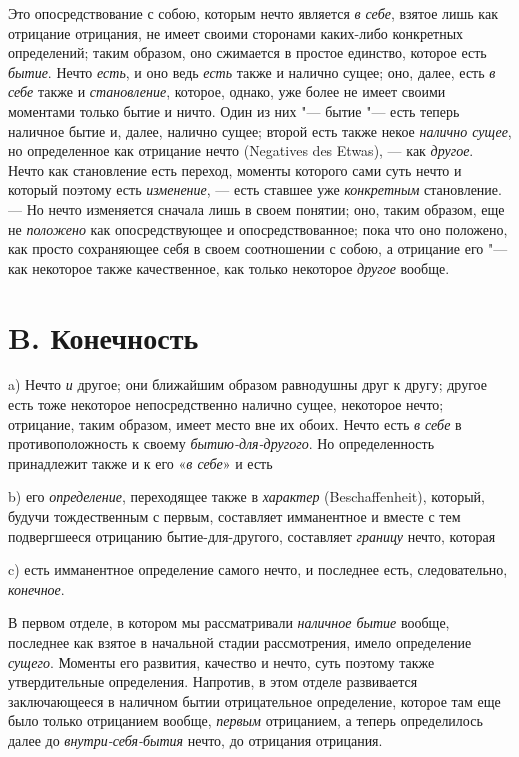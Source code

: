 Это опосредствование с собою, которым нечто является
{\em в себе}, взятое лишь как отрицание отрицания, не
имеет своими сторонами каких-либо конкретных определений; таким образом,
оно сжимается в простое единство, которое есть
{\em бытие}. Нечто {\em есть}, и
оно ведь {\em есть} также и налично сущее; оно, далее,
есть {\em в себе} также и
{\em становление}, которое, однако, уже более не имеет
своими моментами только бытие и ничто. Один из них "--- бытие "--- есть теперь
наличное бытие и, далее, налично сущее; второй есть также некое
{\em налично сущее}, но определенное как отрицание
нечто (\foreignlanguage{english}{Negatives} \foreignlanguage{english}{des}
\foreignlanguage{english}{Etwas}), — как {\em другое}.
Нечто как становление есть переход, моменты которого сами суть нечто и
который поэтому есть {\em изменение}, — есть ставшее
уже {\em конкретным} становление. — Но нечто изменяется
сначала лишь в своем понятии; оно, таким образом, еще не
{\em положено} как опосредствующее и опосредствованное;
пока что оно положено, как просто сохраняющее себя в своем соотношении с
собою, а отрицание его "--- как некоторое также качественное, как только
некоторое {\em другое} вообще.

\section*{B. Конечность}
a) Нечто {\em и} другое; они ближайшим образом
равнодушны друг к другу; другое есть тоже некоторое непосредственно налично
сущее, некоторое нечто; отрицание, таким образом, имеет место вне их обоих.
Нечто есть {\em в себе} в противоположность к своему
{\em бытию-для-другого}. Но определенность принадлежит
также и к его «{\em в себе}» и есть

b) его {\em определение}, переходящее также в
{\em характер} (Beschaffenheit), который, будучи
тождественным с первым, составляет имманентное и вместе с тем подвергшееся
отрицанию бытие-для-другого, составляет {\em границу}
нечто, которая

c) есть имманентное определение самого нечто, и последнее есть,
следовательно, {\em конечное}.

В первом отделе, в котором мы рассматривали
{\em наличное бытие} вообще, последнее как взятое в
начальной стадии рассмотрения, имело определение
{\em сущего}. Моменты его развития, качество и нечто,
суть поэтому также утвердительные определения. Напротив, в этом отделе
развивается заключающееся в наличном бытии отрицательное определение,
которое там еще было только отрицанием вообще,
{\em первым} отрицанием, а теперь определилось далее до
{\em внутри-себя-бытия} нечто, до отрицания отрицания.

